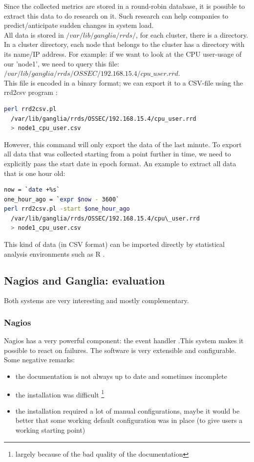 \documentclass[12pt]{report}
\begin{document}
Since the collected metrics are stored in a round-robin database, it is possible to
extract this data to do research on it. Such research can help
companies to predict/anticipate sudden changes in system load.\\

All data is stored in $/var/lib/ganglia/rrds/$, for each cluster,
there is a directory. In a cluster directory, each node that belongs
to the cluster has a directory with its name/IP address.
For example: if we want to look at the CPU user-usage of our 'node1',
we need to query this file:\\
$/var/lib/ganglia/rrds/OSSEC/192.168.15.4/cpu\_user.rrd$. \\This file is
encoded in a binary format; we can export it to a CSV-file using the
rrd2csv program \cite{rrd2csv}:
\begin{lstlisting}[language=bash]
perl rrd2csv.pl  
  /var/lib/ganglia/rrds/OSSEC/192.168.15.4/cpu_user.rrd 
  > node1_cpu_user.csv
\end{lstlisting} 

However, this command will only export the data of the last minute. To
export all data that was collected starting from a point further in time, we need to
explicitly pass the start date in epoch format.
An example to extract all data that is one hour old:
\begin{lstlisting}[language=bash]
now = `date +%s`
one_hour_ago = `expr $now - 3600` 
perl rrd2csv.pl -start $one_hour_ago 
  /var/lib/ganglia/rrds/OSSEC/192.168.15.4/cpu\_user.rrd 
  > node1_cpu_user.csv
\end{lstlisting} 

This kind of data (in CSV format) can be imported directly by statistical analysis
environments such as R \cite{r_software}.

\subsection{Nagios and Ganglia: evaluation}
Both systems are very interesting and mostly complementary.
\subsubsection{Nagios}
Nagios has a very powerful component: the event handler .This system makes it
possible to react on failures. The software is very
extensible and configurable.\\
Some negative remarks: 
\begin{itemize}
\item the documentation is not always up to date and sometimes incomplete
\item the installation was difficult \footnote{largely
  because of the bad quality of the documentation}
\item the installation required a lot of manual configurations,
  maybe it would be better that some working default configuration was
  in place (to give users a working starting point)
\end{itemize}
\end{document}
